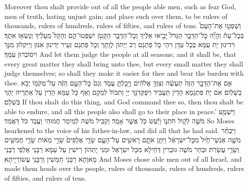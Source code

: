 {Moreover thou shalt provide out of all the people able men, such as fear God, men of truth, hating unjust gain; and place such over them, to be rulers of thousands, rulers of hundreds, rulers of fifties, and rulers of tens.}{}
{וְשָׁפְט֣וּ אֶת־הָעָם֮ בְּכׇל־עֵת֒ וְהָיָ֞ה כׇּל־הַדָּבָ֤ר הַגָּדֹל֙ יָבִ֣יאוּ אֵלֶ֔יךָ וְכׇל־הַדָּבָ֥ר הַקָּטֹ֖ן יִשְׁפְּטוּ־הֵ֑ם וְהָקֵל֙ מֵֽעָלֶ֔יךָ וְנָשְׂא֖וּ אִתָּֽךְ׃
}
{וִידִינוּן יָת עַמָּא בְּכָל עִדָּן וִיהֵי כָּל פִּתְגָם רַב יַיְתוֹן לְוָתָךְ וְכָל פִּתְגָם זְעֵיר יְדִינוּן אִנּוּן וְיֵיקְלוּן מִנָּךְ וִיסוֹבְרוּן עִמָּךְ׃}
{And let them judge the people at all seasons; and it shall be, that every great matter they shall bring unto thee, but every small matter they shall judge themselves; so shall they make it easier for thee and bear the burden with thee.}{}
{אִ֣ם אֶת־הַדָּבָ֤ר הַזֶּה֙ תַּעֲשֶׂ֔ה וְצִוְּךָ֣ אֱלֹהִ֔ים וְיָֽכׇלְתָּ֖ עֲמֹ֑ד וְגַם֙ כׇּל־הָעָ֣ם הַזֶּ֔ה עַל־מְקֹמ֖וֹ יָבֹ֥א בְשָׁלֽוֹם׃
}
{אִם יָת פִּתְגָמָא הָדֵין תַּעֲבֵיד וִיפַקְּדִנָּךְ יְיָ וְתִכּוֹל לִמְקָם וְאַף כָּל עַמָּא הָדֵין עַל אַתְרֵיהּ יְהָךְ בִּשְׁלָם׃}
{If thou shalt do this thing, and God command thee so, then thou shalt be able to endure, and all this people also shall go to their place in peace.’}{}
{וַיִּשְׁמַ֥ע מֹשֶׁ֖ה לְק֣וֹל חֹתְנ֑וֹ וַיַּ֕עַשׂ כֹּ֖ל אֲשֶׁ֥ר אָמָֽר׃}
{וְקַבֵּיל מֹשֶׁה לְמֵימַר חֲמוּהִי וַעֲבַד כֹּל דַּאֲמַר׃}
{So Moses hearkened to the voice of his father-in-law, and did all that he had said.}{}
{וַיִּבְחַ֨ר מֹשֶׁ֤ה אַנְשֵׁי־חַ֙יִל֙ מִכׇּל־יִשְׂרָאֵ֔ל וַיִּתֵּ֥ן אֹתָ֛ם רָאשִׁ֖ים עַל־הָעָ֑ם שָׂרֵ֤י אֲלָפִים֙ שָׂרֵ֣י מֵא֔וֹת שָׂרֵ֥י חֲמִשִּׁ֖ים וְשָׂרֵ֥י עֲשָׂרֹֽת׃}
{וּבְחַר מֹשֶׁה גּוּבְרִין דְּחֵילָא מִכָּל יִשְׂרָאֵל וּמַנִּי יָתְהוֹן רֵישִׁין עַל עַמָּא רַבָּנֵי אַלְפֵי רַבָּנֵי מָאוָתָא רַבָּנֵי חַמְשִׁין וְרַבָּנֵי עֲשׂוֹרְיָיתָא׃}
{And Moses chose able men out of all Israel, and made them heads over the people, rulers of thousands, rulers of hundreds, rulers of fifties, and rulers of tens.}{}
